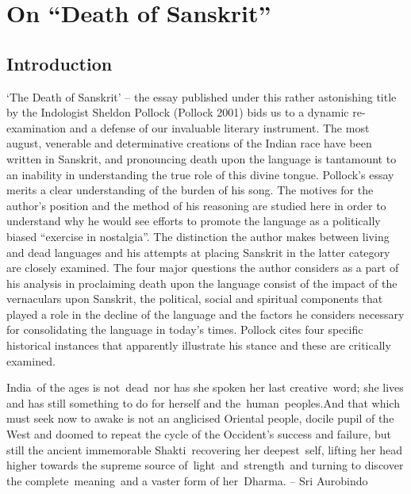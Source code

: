 \chapter{On “Death of Sanskrit”}\label{chapter8}


\section*{Introduction}

‘The Death of Sanskrit’ – the essay published under this rather astonishing title by the Indologist Sheldon Pollock (Pollock 2001) bids us to a dynamic re-examination and a defense of our invaluable literary instrument. The most august, venerable and determinative creations of the Indian race have been written in Sanskrit, and pronouncing death upon the language is tantamount to an inability in understanding the true role of this divine tongue. Pollock’s essay merits a clear understanding of the burden of his song. The motives for the author’s position and the method of his reasoning are studied here in order to understand why he would see efforts to promote the language as a politically biased “exercise in nostalgia”. The distinction the author makes between living and dead languages and his attempts at placing Sanskrit in the latter category are closely examined.  The four major questions the author considers as a part of his analysis in proclaiming death upon the language consist of the impact of the vernaculars upon Sanskrit, the political, social and spiritual components that played a role in the decline of the language and the factors he considers necessary for consolidating the language in today’s times. Pollock cites four specific historical instances that apparently illustrate his stance and these are critically examined.
\newpage

\begin{myquote}
India of the ages is not dead nor has she spoken her last creative word; she lives and has still something to do for herself and the human peoples.\break And that which must seek now to awake is not an anglicised Oriental people, docile pupil of the West and doomed to repeat the cycle of the Occident's success and failure, but still the ancient immemorable  Shakti recovering her deepest self, lifting her head higher towards the supreme source of light and strength and turning to discover the complete meaning and a vaster form of her Dharma. \hfill– Sri Aurobindo
\end{myquote} 

